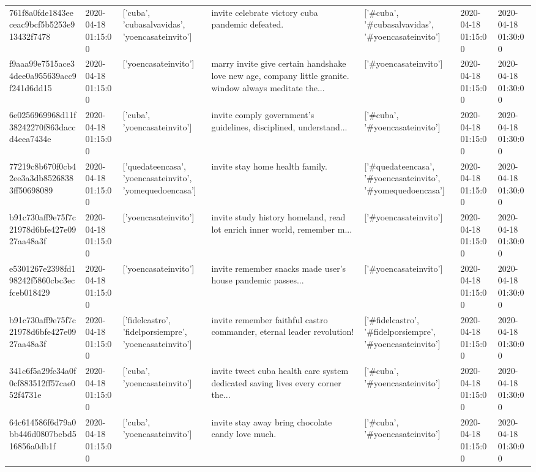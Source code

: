 \begin{tabular}{lllllll}
761f8a0fde1843eeceac9bcf5b5253e913432f7478 & 2020-04-18 01:15:00 & ['cuba', 'cubasalvavidas', 'yoencasateinvito'] & invite celebrate victory cuba pandemic defeated. & ['#cuba', '#cubasalvavidas', '#yoencasateinvito'] & 2020-04-18 01:15:00 & 2020-04-18 01:30:00 \\
f9aaa99e7515ace34dee0a955639acc9f241d6dd15 & 2020-04-18 01:15:00 & ['yoencasateinvito'] & marry invite give certain handshake love new age, company little granite. window always meditate the... & ['#yoencasateinvito'] & 2020-04-18 01:15:00 & 2020-04-18 01:30:00 \\
6e0256969968d11f38242270f863daccd4eea7434e & 2020-04-18 01:15:00 & ['cuba', 'yoencasateinvito'] & invite comply government's guidelines, disciplined, understand... & ['#cuba', '#yoencasateinvito'] & 2020-04-18 01:15:00 & 2020-04-18 01:30:00 \\
77219c8b670f0cb42ee3a3db85268383ff50698089 & 2020-04-18 01:15:00 & ['quedateencasa', 'yoencasateinvito', 'yomequedoencasa'] & invite stay home health family. & ['#quedateencasa', '#yoencasateinvito', '#yomequedoencasa'] & 2020-04-18 01:15:00 & 2020-04-18 01:30:00 \\
b91c730aff9e75f7c21978d6bfe427e0927aa48a3f & 2020-04-18 01:15:00 & ['yoencasateinvito'] & invite study history homeland, read lot enrich inner world, remember m... & ['#yoencasateinvito'] & 2020-04-18 01:15:00 & 2020-04-18 01:30:00 \\
e5301267e2398fd198242f5860cbc3ecfceb018429 & 2020-04-18 01:15:00 & ['yoencasateinvito'] & invite remember snacks made user's house pandemic passes... & ['#yoencasateinvito'] & 2020-04-18 01:15:00 & 2020-04-18 01:30:00 \\
b91c730aff9e75f7c21978d6bfe427e0927aa48a3f & 2020-04-18 01:15:00 & ['fidelcastro', 'fidelporsiempre', 'yoencasateinvito'] & invite remember faithful castro commander, eternal leader revolution! & ['#fidelcastro', '#fidelporsiempre', '#yoencasateinvito'] & 2020-04-18 01:15:00 & 2020-04-18 01:30:00 \\
341c6f5a29fc34a0f0cf883512ff57cae052f4731e & 2020-04-18 01:15:00 & ['cuba', 'yoencasateinvito'] & invite tweet cuba health care system dedicated saving lives every corner the... & ['#cuba', '#yoencasateinvito'] & 2020-04-18 01:15:00 & 2020-04-18 01:30:00 \\
64c614586f6d79a0bb446d0807bebd516856a0db1f & 2020-04-18 01:15:00 & ['cuba', 'yoencasateinvito'] & invite stay away bring chocolate candy love much. & ['#cuba', '#yoencasateinvito'] & 2020-04-18 01:15:00 & 2020-04-18 01:30:00 \\

\end{tabular}
